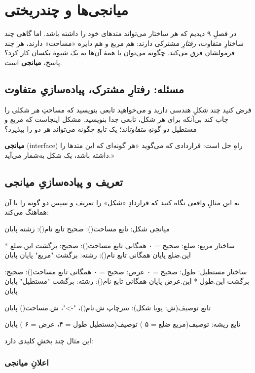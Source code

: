 \chapter{میانجی‌ها و چندریختی}%
\label{ch:interfaces}

در فصلِ ۹ دیدیم که هر ساختار می‌تواند متدهای خود را داشته باشد. اما گاهی چند
ساختارِ متفاوت، \emph{رفتارِ} مشترکی دارند: هم مربع و هم دایره «مساحت» دارند، هر
چند فرمولشان فرق می‌کند. چگونه می‌توان با همهٔ آن‌ها به یک شیوهٔ یکسان کار کرد؟
پاسخ، \textbf{میانجی} است.

\section{مسئله: رفتارِ مشترک، پیاده‌سازیِ متفاوت}

فرض کنید چند شکلِ هندسی دارید و می‌خواهید تابعی بنویسید که مساحتِ \emph{هر}
شکلی را چاپ کند بی‌آنکه برای هر شکل، تابعی جدا بنویسید. مشکل اینجاست که مربع
و مستطیل دو گونهِ \emph{متفاوت}اند؛ یک تابع چگونه می‌تواند هر دو را بپذیرد؟

\textbf{میانجی} (interface) راهِ حل است: قراردادی که می‌گوید «هر گونه‌ای که این
متدها را داشته باشد، یک شکل به‌شمار می‌آید.»

\section{تعریف و پیاده‌سازیِ میانجی}

به این مثالِ واقعی نگاه کنید که قراردادِ «شکل» را تعریف و سپس دو گونه را با آن
هماهنگ می‌کند:

\begin{salamfa}
میانجی شکل:
    تابع مساحت(): صحیح
    تابع نام(): رشته
پایان

ساختار مربع:
    ضلع: صحیح = ۰
    همگانی تابع مساحت(): صحیح: برگشت این.ضلع * این.ضلع پایان
    همگانی تابع نام(): رشته: برگشت "مربع" پایان
پایان

ساختار مستطیل:
    طول: صحیح = ۰
    عرض: صحیح = ۰
    همگانی تابع مساحت(): صحیح: برگشت این.طول * این.عرض پایان
    همگانی تابع نام(): رشته: برگشت "مستطیل" پایان
پایان

تابع توصیف(ش: پویا شکل):
    سرچاپ ش.نام()، "->"، ش.مساحت()
پایان

تابع ریشه:
    توصیف(مربع { ضلع = ۵ })
    توصیف(مستطیل { طول = ۴، عرض = ۶ })
پایان
\end{salamfa}

این مثال چند بخشِ کلیدی دارد:

\subsection{اعلانِ میانجی}


